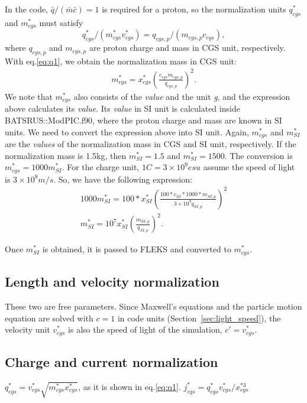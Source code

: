 \documentclass[a4paper, 11pt]{article}
\begin{document}
In the code, $\bar{q}/(\bar{m}\bar{c}) = 1$ is required for a proton, so the normalization units $q_{cgs}^*$ and $m_{cgs}^*$ must satisfy 
\begin{equation}
q_{cgs}^*/(m_{cgs}^*v_{cgs}^*) = q_{cgs,p}/(m_{cgs,p}c_{cgs}),     
\end{equation}
where $q_{cgs,p}$ and $m_{cgs,p}$ are proton charge and mass in CGS unit, respectively. With eq.\ref{eq:q1}, we obtain the normalization mass in CGS unit:
\begin{eqnarray}
m_{cgs}^* = x_{cgs}^*(\frac{c_{cgs}m_{cgs,p}}{q_{cgs,p}})^2.
\end{eqnarray}
We note that $m_{cgs}^*$ also consists of the \textit{value} and the unit \textit{g}, and the expression above calculates its \textit{value}. Its \textit{value} in SI unit is calculated inside BATSRUS::ModPIC.f90, where the proton charge and mass are known in SI units. We need to convert the expression above into SI unit. Again, $m_{cgs}^*$ and $m_{SI}^*$ are the \textit{values} of the normalization mass in CGS and SI unit, respectively. If the normalization mass is 1.5kg, then $m_{SI}^* = 1.5$ and $m_{SI}^* = 1500$. The conversion is $m_{cgs}^* = 1000m_{SI}^*$. For the charge unit, $1C = 3\times 10^9 esu$ assume the speed of light is $3 \times 10^8m/s$. So, we have the following expression:
\begin{eqnarray}
1000m_{SI}^* = 100*x_{SI}^*(\frac{100*c_{SI}*1000*m_{SI,p}}{3\times10^9 q_{SI,p}})^2 \\
m_{SI}^* = 10^7x_{SI}^*(\frac{m_{SI,p}}{q_{SI,p}})^2.
\end{eqnarray}

Once $m_{SI}^*$ is obtained, it is passed to FLEKS and converted to $m_{cgs}^*$. 

\subsection{Length and velocity normalization}

These two are free parameters. Since Maxwell's equations and the particle motion equation are solved with $c = 1$ in code units (Section~\ref{sec:light_speed}), the velocity unit $v_{cgs}^*$ is also the speed of light of the simulation, $c' = v_{cgs}^*$.

\subsection{Charge and current normalization}

$q_{cgs}^*=v_{cgs}^* \sqrt{m_{cgs}^* x_{cgs}^*}$, as it is shown in eq.\ref{eq:q1}. $j_{cgs}^* = q_{cgs}^*v_{cgs}^*/x_{cgs}^{*3}$
\end{document}
